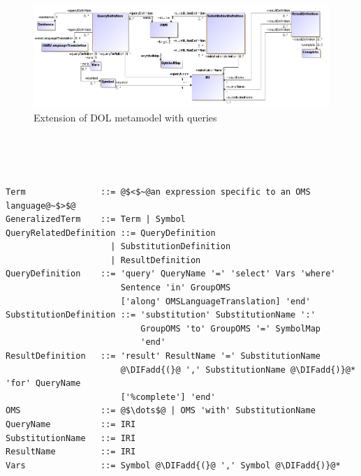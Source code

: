 \documentclass[10pt, a4paper]{isov2}
\newcommand{\bc}[1]{~\\{\color{violet}\large \hrulefill \href{http://issues.omg.org/browse/DOL-#1}{\normalfont{JIRA DOL-{}#1}} \hrulefill\\}  }
\newcommand{\ec}[0]{~\\{{\color{violet}\large \hrulefill {\normalfont{end}} \hrulefill\\}  }}
\providecommand{\DIFaddtex}[1]{{\protect\color{blue}\uwave{#1}}} %
\providecommand{\DIFadd}[1]{\texorpdfstring{\DIFaddtex{#1}}{#1}} %
\begin{document}
\begin{figure}
    \centering
      \includegraphics[scale=0.5]{mof/queries.png}
     \caption{Extension of DOL metamodel with queries}
    \label{fig:queries} 
\end{figure}




\bc{92}
\begin{lstlisting}[language=ebnf,escapeinside={@@},mathescape]

Term               ::= @$<$~@an expression specific to an OMS language@~$>$@ 
GeneralizedTerm    ::= Term | Symbol
QueryRelatedDefinition ::= QueryDefinition
                     | SubstitutionDefinition
                     | ResultDefinition
QueryDefinition    ::= 'query' QueryName '=' 'select' Vars 'where'
                       Sentence 'in' GroupOMS
                       ['along' OMSLanguageTranslation] 'end'
SubstitutionDefinition ::= 'substitution' SubstitutionName ':'
                           GroupOMS 'to' GroupOMS '=' SymbolMap
                           'end'
ResultDefinition   ::= 'result' ResultName '=' SubstitutionName
                       @\DIFadd{(}@ ',' SubstitutionName @\DIFadd{)}@* 'for' QueryName
                       ['%complete'] 'end'
OMS                ::= @$\dots$@ | OMS 'with' SubstitutionName 
QueryName          ::= IRI
SubstitutionName   ::= IRI
ResultName         ::= IRI
Vars               ::= Symbol @\DIFadd{(}@ ',' Symbol @\DIFadd{)}@*
\end{lstlisting}
\ec

\end{document}
